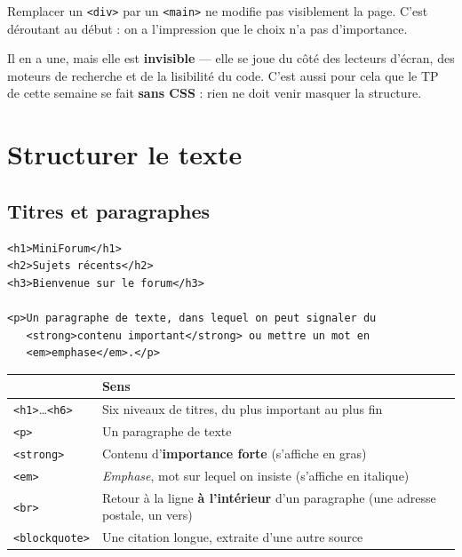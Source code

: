 \documentclass[a4paper,11pt]{article}
\newcommand{\hdr}[1]{\multicolumn{1}{l}{\color{white}\bfseries #1}}
\renewcommand{\arraystretch}{1.3}
\begin{document}
\begin{tcolorbox}[attention, title={Une balise sémantique ne change (presque) rien à l'affichage}]
Remplacer un \texttt{<div>} par un \texttt{<main>} ne modifie pas visiblement la page. C'est déroutant au début : on a l'impression que le choix n'a pas d'importance.

\vspace{3pt}
Il en a une, mais elle est \textbf{invisible} --- elle se joue du côté des lecteurs d'écran, des moteurs de recherche et de la lisibilité du code. C'est aussi pour cela que le TP de cette semaine se fait \textbf{sans CSS} : rien ne doit venir masquer la structure.
\end{tcolorbox}

\section{Structurer le texte}

\subsection{Titres et paragraphes}

\begin{lstlisting}[language=HTML5, caption={Titres et texte}]
<h1>MiniForum</h1>
<h2>Sujets récents</h2>
<h3>Bienvenue sur le forum</h3>

<p>Un paragraphe de texte, dans lequel on peut signaler du
   <strong>contenu important</strong> ou mettre un mot en
   <em>emphase</em>.</p>
\end{lstlisting}

\begin{center}
\renewcommand{\arraystretch}{1.0}
\begin{tabularx}{\linewidth}{p{2.4cm}X}
  \toprule
  \rowcolor{uniNavy}
  \hdr{Balise} & \hdr{Sens} \\
  \midrule
  \rowcolor{uniPaper}
  \texttt{<h1>}\dots\texttt{<h6>} & Six niveaux de titres, du plus important au plus fin \\
  \texttt{<p>} & Un paragraphe de texte \\
  \rowcolor{uniPaper}
  \texttt{<strong>} & Contenu d'\textbf{importance forte} (s'affiche en gras) \\
  \texttt{<em>} & \textit{Emphase}, mot sur lequel on insiste (s'affiche en italique) \\
  \rowcolor{uniPaper}
  \texttt{<br>} & Retour à la ligne \textbf{à l'intérieur} d'un paragraphe (une adresse postale, un vers) \\
  \texttt{<blockquote>} & Une citation longue, extraite d'une autre source \\
  \bottomrule
\end{tabularx}
\end{center}
\end{document}
